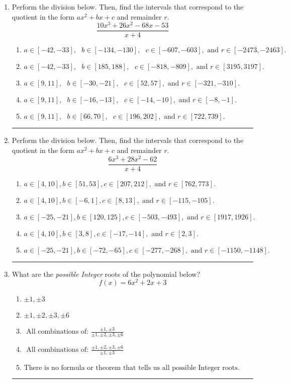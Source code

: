 \documentclass[14pt]{extbook}
\newcommand{\litem}[1]{\item#1\hspace*{-1cm}\rule{\textwidth}{0.4pt}}
\begin{document}
\begin{enumerate}
{\begin{enumerate}[label=\Alph*.]
\end{enumerate} }
\litem{
Perform the division below. Then, find the intervals that correspond to the quotient in the form $ax^2+bx+c$ and remainder $r$.\[ \frac{10x^{3} +26 x^{2} -68 x -53}{x + 4} \]\begin{enumerate}[label=\Alph*.]
\item \( a \in [-42, -33], \text{   } b \in [-134, -130], \text{   } c \in [-607, -603], \text{   and   } r \in [-2473, -2463]. \)
\item \( a \in [-42, -33], \text{   } b \in [185, 188], \text{   } c \in [-818, -809], \text{   and   } r \in [3195, 3197]. \)
\item \( a \in [9, 11], \text{   } b \in [-30, -21], \text{   } c \in [52, 57], \text{   and   } r \in [-321, -310]. \)
\item \( a \in [9, 11], \text{   } b \in [-16, -13], \text{   } c \in [-14, -10], \text{   and   } r \in [-8, -1]. \)
\item \( a \in [9, 11], \text{   } b \in [66, 70], \text{   } c \in [196, 202], \text{   and   } r \in [722, 739]. \)

\end{enumerate} }
\litem{
Perform the division below. Then, find the intervals that correspond to the quotient in the form $ax^2+bx+c$ and remainder $r$.\[ \frac{6x^{3} +28 x^{2} -62}{x + 4} \]\begin{enumerate}[label=\Alph*.]
\item \( a \in [4, 10], b \in [51, 53], c \in [207, 212], \text{ and } r \in [762, 773]. \)
\item \( a \in [4, 10], b \in [-6, 1], c \in [8, 13], \text{ and } r \in [-115, -105]. \)
\item \( a \in [-25, -21], b \in [120, 125], c \in [-503, -493], \text{ and } r \in [1917, 1926]. \)
\item \( a \in [4, 10], b \in [3, 8], c \in [-17, -14], \text{ and } r \in [2, 3]. \)
\item \( a \in [-25, -21], b \in [-72, -65], c \in [-277, -268], \text{ and } r \in [-1150, -1148]. \)

\end{enumerate} }
\litem{
What are the \textit{possible Integer} roots of the polynomial below?\[ f(x) = 6x^{2} +2 x + 3 \]\begin{enumerate}[label=\Alph*.]
\item \( \pm 1,\pm 3 \)
\item \( \pm 1,\pm 2,\pm 3,\pm 6 \)
\item \( \text{ All combinations of: }\frac{\pm 1,\pm 3}{\pm 1,\pm 2,\pm 3,\pm 6} \)
\item \( \text{ All combinations of: }\frac{\pm 1,\pm 2,\pm 3,\pm 6}{\pm 1,\pm 3} \)
\item \( \text{There is no formula or theorem that tells us all possible Integer roots.} \)


\end{enumerate}}
\end{enumerate}
\end{document}
